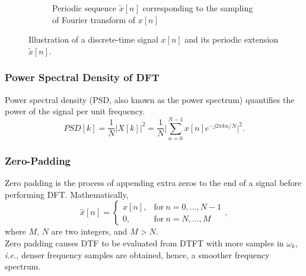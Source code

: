 \begin{figure}[H]
\begin{subfigure}{\textwidth}
\caption{Periodic sequence $\widetilde{x}[n]$ corresponding to the sampling of Fourier transform of $x[n]$}
\end{subfigure}
\caption{Illustration of a discrete-time signal $x[n]$ and its periodic extension $\widetilde{x}[n]$.}
\end{figure}

\subsubsection{Power Spectral Density of DFT}
Power spectral density (PSD, also known as the power spectrum) quantifies the power of the signal per unit frequency.
\[
    PSD[k] = \frac{1}{N}\lvert X[k] \rvert^2 = \frac{1}{N} \bigg \lvert  \sum_{n=0}^{N-1} x[n] e^{-j 2 \pi kn/N}\bigg \rvert^2. 
\]

\subsubsection{Zero-Padding}
Zero padding is the process of appending extra zeros to the end of a signal before performing DFT. Mathematically,
\[
    \hat{x}[n] = 
    \begin{cases}
        x[n], & \text{for} \ n = 0, ..., N-1\\
        0, & \text{for} \ n = N, ..., M
    \end{cases},
\]
where $M$, $N$ are two integers, and $M>N$. \\

Zero padding causes DTF to be evaluated from DTFT with more samples in $\omega_k$, \textit{i.e.}, denser frequency samples are obtained, hence, a smoother frequency spectrum.

